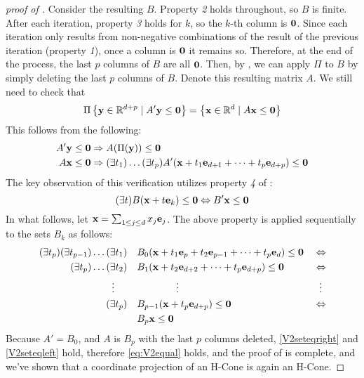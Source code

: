 \begin{proof}[proof of \Vproj]
	Consider the resulting $B$.  Property \textit{2} holds throughout, so $B$ is finite.  After each iteration, property \textit{3} holds for $k$, so the $k$-th column is $\mathbf{0}$.  Since each iteration only results from non-negative combinations of the result of the previous iteration (property \textit{1}), once a column is $\mathbf{0}$ it remains so.  Therefore, at the end of the process, the last $p$ columns of $B$ are all $\mathbf{0}$.  Then, by , we can apply $\Pi$ to $B$ by simply deleting the last $p$ columns of $B$.  Denote this resulting matrix $A$.  We still need to check that
	\begin{equation}\label{eq:V2equal}
		\Pi\left\{\mathbf{y}\in\mathbb{R}^{d+p}\;|\; A'\mathbf{y}\leq\mathbf{0}\right\} = \left\{\mathbf{x}\in\mathbb{R}^{d}\;|\; A\mathbf{x}\leq\mathbf{0}\right\}
	\end{equation}
	This follows from the following:
	\begin{align}
		A'\mathbf{y} & \leq \mathbf{0} \Rightarrow A(\Pi(\mathbf{y})) \leq \mathbf{0} \label{V2seteqright}                                                           \\
		A\mathbf{x}  & \leq \mathbf{0} \Rightarrow (\exists t_1)\dots(\exists t_p) A'(\mathbf{x}+t_1\mathbf{e}_{d+1}+\cdots+t_p\mathbf{e}_{d+p}) \leq \mathbf{0} \label{V2seteqleft}
	\end{align}
	The key observation of this verification utilizes property \textit{4} of :
	\[ (\exists t)B(\mathbf{x} + t\mathbf{e}_k) \leq \mathbf{0} \Leftrightarrow B'\mathbf{x} \leq \mathbf{0} \]
	In what follows, let $\mathbf{x} = \sum_{1 \leq j \leq d}x_j\mathbf{e}_j$.  The above property is applied sequentially to the sets $B_k$ as follows:
	\begin{alignat*}{2}
		(\exists t_p)(\exists t_{p-1})\dots(\exists t_1)                & \quad
		B_0(\mathbf{x} + t_1\mathbf{e}_{p} + t_2\mathbf{e}_{p-1} + \dots + t_p\mathbf{e}_{d}) \leq \mathbf{0}\; & \Leftrightarrow                                                 \\
		(\exists t_p)\dots(\exists t_2)                                 & \quad
		B_1(\mathbf{x} + t_2\mathbf{e}_{d+2} + \dots + t_p\mathbf{e}_{d+p})
		\leq \mathbf{0}                                                         & \Leftrightarrow                                                 \\
		\vdots \hspace{1.3em}                                           & \hspace{5em}\vdots                       & \vdots\hspace{0.4em} \\
		(\exists t_p)                                                   & \quad B_{p-1}(\mathbf{x} + t_p\mathbf{e}_{d+p})  \leq \mathbf{0} & \Leftrightarrow      \\
		                                                                & \quad B_{p}\mathbf{x}  \leq \mathbf{0}                   &
	\end{alignat*}
	Because $A' = B_0$, and $A$ is $B_p$ with the last $p$ columns deleted, \eqref{V2seteqright} and \eqref{V2seteqleft} hold, therefore \eqref{eq:V2equal} holds, and the proof of  is complete, and we've shown that a coordinate projection of an H-Cone is again an H-Cone.
\end{proof}

